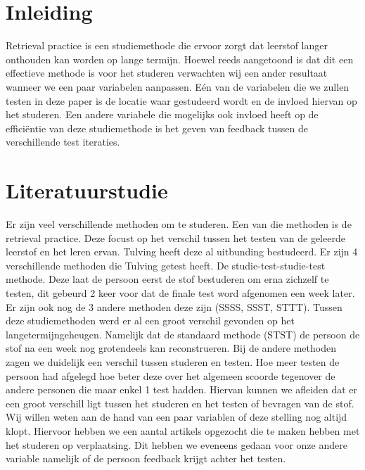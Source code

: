 \documentclass{hogent-article}
\affiliation{
	\textsuperscript{1} \href{mailto:Olivier.troch.w2257@student.hogent.be}{Olivier.troch.w2257@student.hogent.be}
}
\affiliation{
	\textsuperscript{2} \href{mailto:daan.vanvooren.y1502@student.hogent.be}{daan.vanvooren.y1502@student.hogent.be}
}
\affiliation{
	\textsuperscript{3}
	\href{mailto:robbie.verdurme.y9234@student.hogent.be}{robbie.verdurme.y9234@student.hogent.be}
}
\affiliation{
	\textsuperscript{4}
	\href{mailto;sebastien.wojtyla.y3274@student.hogent.be}{sebastien.wojtyla.y3274@student.hogent.be}
}
\begin{document}
	
	\flushbottom %
	\maketitle %
	\tableofcontents %
	\thispagestyle{empty} %
	
	
	\section{Inleiding}
	Retrieval practice is een studiemethode die ervoor zorgt dat leerstof langer onthouden kan worden op lange termijn. Hoewel reeds aangetoond is dat dit een effectieve methode is voor het studeren verwachten wij een ander resultaat wanneer we een paar variabelen aanpassen. Eén van de variabelen die we zullen testen in deze paper is de locatie waar gestudeerd wordt en de invloed hiervan op het studeren. 
	Een andere variabele die mogelijks ook invloed heeft op de efficiëntie van deze studiemethode is het geven van feedback tussen de verschillende test iteraties.
	
	\section{Literatuurstudie}
	Er zijn veel verschillende methoden om te studeren. Een van die methoden is de retrieval practice. Deze focust op het verschil tussen het testen van de geleerde leerstof en het leren ervan.
	Tulving \autocite{} heeft deze al uitbunding bestudeerd. Er zijn 4 verschillende methoden die Tulving getest heeft. De studie-test-studie-test methode. Deze laat de persoon eerst de stof bestuderen om erna zichzelf te testen, dit gebeurd 2 keer voor dat de finale test word afgenomen een week later. Er zijn ook nog de 3 andere methoden deze zijn (SSSS, SSST, STTT).
	Tussen deze studiemethoden werd er al een groot verschil gevonden op het langetermijngeheugen. Namelijk dat de standaard methode (STST) de persoon de stof na een week nog grotendeels kan reconstrueren. Bij de andere methoden zagen we duidelijk een verschil tussen studeren en testen. Hoe meer testen de persoon had afgelegd hoe beter deze over het algemeen scoorde tegenover de andere personen die maar enkel 1 test hadden. Hiervan kunnen we afleiden dat er een groot verschill ligt tussen het studeren en het testen of bevragen van de stof.
	Wij willen weten aan de hand van een paar variablen of deze stelling nog altijd klopt. Hiervoor hebben we een aantal artikels opgezocht die te maken hebben met het studeren op verplaatsing. Dit hebben we eveneens gedaan voor onze andere variable namelijk of de persoon feedback krijgt achter het testen.
    
\end{document}
